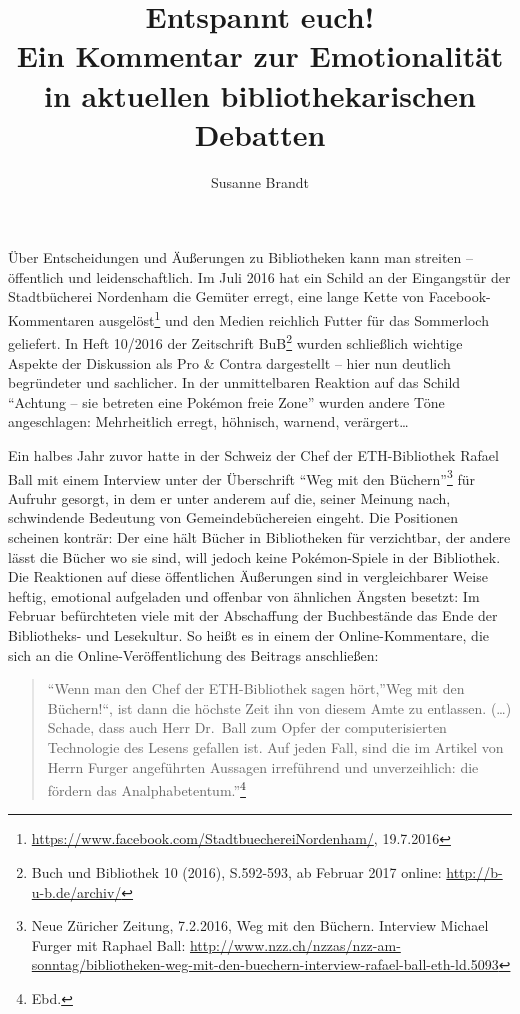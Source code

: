 \documentclass[a4paper,
fontsize=11pt,
oneside,
numbers=noperiodatend,
parskip=half-,
bibliography=totoc,
final
]{scrartcl}
\title{\LARGE{Entspannt euch!\\ Ein Kommentar zur Emotionalität in aktuellen bibliothekarischen Debatten}} %
\author{Susanne Brandt} %
\date{}
\begin{document}
\maketitle
\thispagestyle{fancyplain} 


Über Entscheidungen und Äußerungen zu Bibliotheken kann man streiten --
öffentlich und leidenschaftlich. Im Juli 2016 hat ein Schild an der
Eingangstür der Stadtbücherei Nordenham die Gemüter erregt, eine lange
Kette von Facebook-Kommentaren ausgelöst\footnote{\url{https://www.facebook.com/StadtbuechereiNordenham/},
  19.7.2016} und den Medien reichlich Futter für das Sommerloch
geliefert. In Heft 10/2016 der Zeitschrift BuB\footnote{Buch und
  Bibliothek 10 (2016), S.592-593, ab Februar 2017 online:
  \url{http://b-u-b.de/archiv/}} wurden schließlich wichtige Aspekte der
Diskussion als Pro \& Contra dargestellt -- hier nun deutlich
begründeter und sachlicher. In der unmittelbaren Reaktion auf das Schild
\enquote{Achtung -- sie betreten eine Pokémon freie Zone} wurden andere
Töne angeschlagen: Mehrheitlich erregt, höhnisch, warnend,
verärgert\ldots{}

Ein halbes Jahr zuvor hatte in der Schweiz der Chef der ETH-Bibliothek
Rafael Ball mit einem Interview unter der Überschrift \enquote{Weg mit
den Büchern}\footnote{Neue Züricher Zeitung, 7.2.2016, Weg mit den
  Büchern. Interview Michael Furger mit Raphael Ball:
  \url{http://www.nzz.ch/nzzas/nzz-am-sonntag/bibliotheken-weg-mit-den-buechern-interview-rafael-ball-eth-ld.5093}}
für Aufruhr gesorgt, in dem er unter anderem auf die, seiner Meinung
nach, schwindende Bedeutung von Gemeindebüchereien eingeht. Die
Positionen scheinen konträr: Der eine hält Bücher in Bibliotheken für
verzichtbar, der andere lässt die Bücher wo sie sind, will jedoch keine
Pokémon-Spiele in der Bibliothek. Die Reaktionen auf diese öffentlichen
Äußerungen sind in vergleichbarer Weise heftig, emotional aufgeladen und
offenbar von ähnlichen Ängsten besetzt: Im Februar befürchteten viele
mit der Abschaffung der Buchbestände das Ende der Bibliotheks- und
Lesekultur. So heißt es in einem der Online-Kommentare, die sich an die
Online-Veröffentlichung des Beitrags anschließen:

\begin{quote}
\enquote{Wenn man den Chef der ETH-Bibliothek sagen hört,}Weg mit den
Büchern!\enquote{, ist dann die höchste Zeit ihn von diesem Amte zu
entlassen. (\ldots{}) Schade, dass auch Herr Dr.~Ball zum Opfer der
computerisierten Technologie des Lesens gefallen ist. Auf jeden Fall,
sind die im Artikel von Herrn Furger angeführten Aussagen irreführend
und unverzeihlich: die fördern das Analphabetentum.}\footnote{Ebd.}
\end{quote}
\end{document}
